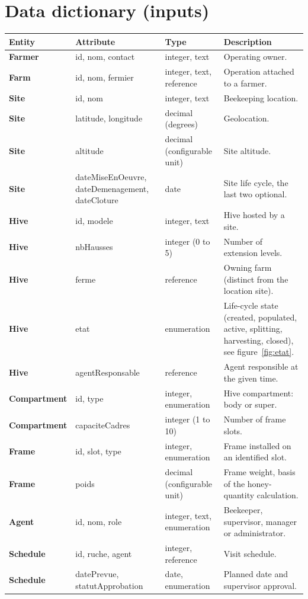 \section{Data dictionary (inputs)}
\begin{xltabular}{\textwidth}{>{\bfseries}p{2.6cm} p{3.4cm} p{2.4cm} X}
\toprule
\textbf{Entity} & \textbf{Attribute} & \textbf{Type} & \textbf{Description} \\
\midrule
\endhead
Farmer & id, nom, contact & integer, text & Operating owner. \\
Farm & id, nom, fermier & integer, text, reference & Operation attached to a farmer. \\
Site & id, nom & integer, text & Beekeeping location. \\
Site & latitude, longitude & decimal (degrees) & Geolocation. \\
Site & altitude & decimal (configurable unit) & Site altitude. \\
Site & dateMiseEnOeuvre, dateDemenagement, dateCloture & date & Site life cycle, the last two optional. \\
Hive & id, modele & integer, text & Hive hosted by a site. \\
Hive & nbHausses & integer (0 to 5) & Number of extension levels. \\
Hive & ferme & reference & Owning farm (distinct from the location site). \\
Hive & etat & enumeration & Life-cycle state (created, populated, active, splitting, harvesting, closed), see figure~\ref{fig:etat}. \\
Hive & agentResponsable & reference & Agent responsible at the given time. \\
Compartment & id, type & integer, enumeration & Hive compartment: body or super. \\
Compartment & capaciteCadres & integer (1 to 10) & Number of frame slots. \\
Frame & id, slot, type & integer, enumeration & Frame installed on an identified slot. \\
Frame & poids & decimal (configurable unit) & Frame weight, basis of the honey-quantity calculation. \\
Agent & id, nom, role & integer, text, enumeration & Beekeeper, supervisor, manager or administrator. \\
Schedule & id, ruche, agent & integer, reference & Visit schedule. \\
Schedule & datePrevue, statutApprobation & date, enumeration & Planned date and supervisor approval. \\

\end{xltabular}
